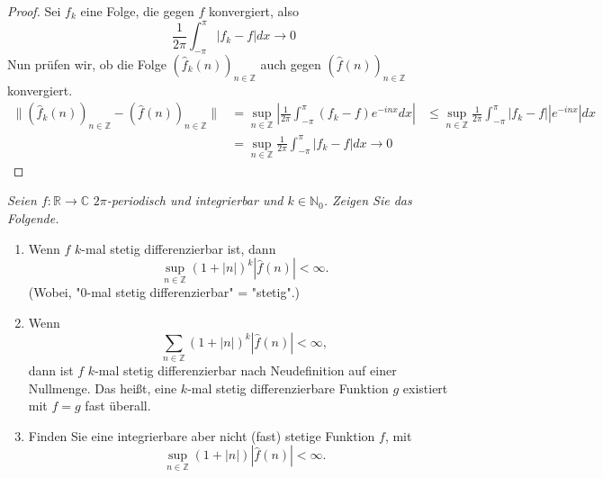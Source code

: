 \documentclass[11pt]{article}
\newcommand{\Z}{\mathbb{Z}}
\newenvironment{problem}[2][Beispiel]{
    \begin{trivlist}
        \item[\hskip \labelsep {\bfseries #1}\hskip \labelsep {\bfseries #2.}] \itshape}{
    \end{trivlist}\normalshape
}
\begin{document}
    \begin{proof}
        Sei $f_k$ eine Folge, die gegen $f$ konvergiert, also
        $$\frac{1}{2\pi}\int_{-\pi}^{\pi}|f_k-f|dx \to 0$$
        Nun prüfen wir, ob die Folge $(\hat{f}_k(n))_{n\in\Z}$ auch gegen $(\hat{f}(n))_{n\in\Z}$
        konvergiert.
        $$\begin{aligned}
              \|(\hat{f}_k(n))_{n\in\Z}- (\hat{f}(n))_{n\in\Z}\| &=
              \sup_{n\in\Z}\left|\frac{1}{2\pi}\int_{-\pi}^{\pi}(f_k-f)e^{-inx}dx\right|
              &\leq \sup_{n\in\Z}\frac{1}{2\pi}\int_{-\pi}^{\pi}|f_k-f||e^{-inx}|dx\\
              &=\sup_{n\in\Z}\frac{1}{2\pi}\int_{-\pi}^{\pi}|f_k-f|dx\to 0
        \end{aligned}$$
    \end{proof}

    \begin{problem}{4}
        Seien $f: \mathbb{R} \rightarrow \mathbb{C} \,\,2 \pi$-periodisch und integrierbar und
        $k \in \mathbb{N}_0$. Zeigen Sie das Folgende.
        \begin{enumerate}[label = (\alph*)]
            \item Wenn $f\,\, k$-mal stetig differenzierbar ist, dann
            $$
            \sup _{n \in \mathbb{Z}}(1+|n|)^k|\hat{f}(n)|<\infty .
            $$
            (Wobei, "0-mal stetig differenzierbar" = "stetig".)
            \item Wenn
            $$
            \sum_{n \in \mathbb{Z}}(1+|n|)^k|\hat{f}(n)|<\infty,
            $$
            dann ist $f\,\, k$-mal stetig differenzierbar nach Neudefinition auf einer Nullmenge. Das heißt, eine
            $k$-mal stetig differenzierbare Funktion $g$ existiert mit $f=g$ fast überall.
            \item Finden Sie eine integrierbare aber nicht (fast) stetige Funktion $f$, mit
            $$
            \sup _{n \in \mathbb{Z}}(1+|n|)|\hat{f}(n)|<\infty .
            $$
        \end{enumerate}
    \end{problem}
\end{document}
